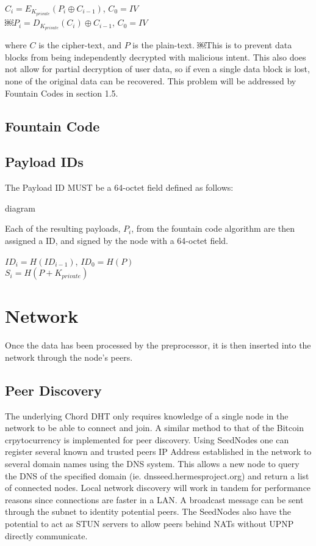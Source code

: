\documentclass[journal]{IEEEtran}
\begin{document}
\begin{center}
$C_i = E_{K_{private}}(P_i \oplus{} C_{i-1})$, $C_0 = IV$\\
$￼P_i = D_{K_{private}}(C_i) \oplus{} C_{i-1}$, $C_0 = IV$
\end{center}

\noindent
where $C$ is the cipher-text, and $P$ is the plain-text. ￼This is to prevent data blocks from being independently decrypted with malicious intent. This also does not allow for partial decryption of user data, so if even a single data block is lost, none of the original data can be recovered. This problem will be addressed by Fountain Codes in section 1.5.

\subsection{Fountain Code}


\subsection{Payload IDs}
The Payload ID MUST be a 64-octet field defined as follows:

diagram

Each of the resulting payloads, $P_i$, from the fountain code algorithm are then assigned a ID, and signed by the node with a 64-octet field.

\begin{center}
$ID_i = H(ID_{i-1})$, $ID_0 = H(P)$\\
$S_i = H(P + K_{private})$
\end{center}

\section{Network}
Once the data has been processed by the preprocessor, it is then inserted into the network through the node's peers.

\subsection{Peer Discovery} %
The underlying Chord DHT only requires knowledge of a single node in the network to be able to connect and join. A similar method to that of the Bitcoin crpytocurrency is implemented for peer discovery. Using SeedNodes one can register several known and trusted peers IP Address established in the network to several domain names using the DNS system. This allows a new node to query the DNS of the specified domain (ie. dnsseed.hermesproject.org) and return a list of connected nodes. Local network discovery will work in tandem for performance reasons since connections are faster in a LAN. A broadcast message can be sent through the subnet to identity potential peers. The SeedNodes also have the potential to act as STUN servers to allow peers behind NATs without UPNP directly communicate.
\end{document}
